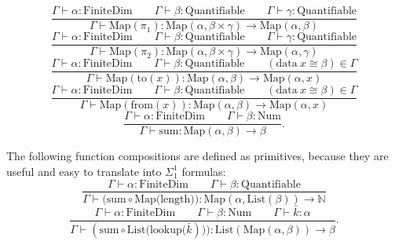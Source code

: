 \documentclass[11pt]{article}
\begin{document}
\begin{equation}
	\frac{
		\Gamma \vdash \alpha : \text{FiniteDim}
		\qquad \Gamma \vdash \beta : \text{Quantifiable}
		\qquad \Gamma \vdash \gamma : \text{Quantifiable}
	}{
		\Gamma \vdash \text{Map}(\pi_1)
		: \text{Map}(\alpha, \beta \times \gamma)
		\to \text{Map}(\alpha, \beta)
	}
\end{equation}
\begin{equation}
	\frac{
		\Gamma \vdash \alpha : \text{FiniteDim}
		\qquad \Gamma \vdash \beta : \text{Quantifiable}
		\qquad \Gamma \vdash \gamma : \text{Quantifiable}
	}{
		\Gamma \vdash \text{Map}(\pi_2)
		: \text{Map}(\alpha, \beta \times \gamma)
		\to \text{Map}(\alpha, \gamma)
	}
\end{equation}
\begin{equation}
	\frac{
		\Gamma \vdash \alpha : \text{FiniteDim}
		\qquad \Gamma \vdash \beta : \text{Quantifiable}
		\qquad (\text{data}\ x \cong \beta) \in \Gamma
	}{
		\Gamma \vdash \text{Map}(\text{to}(x)) : \text{Map}(\alpha, \beta) \to \text{Map}(\alpha, x)
	}
\end{equation}
\begin{equation}
	\frac{
		\Gamma \vdash \alpha : \text{FiniteDim}
		\qquad \Gamma \vdash \beta : \text{Quantifiable}
		\qquad (\text{data}\ x \cong \beta) \in \Gamma
	}{
		\Gamma \vdash \text{Map}(\text{from}(x)) : \text{Map}(\alpha, \beta) \to \text{Map}(\alpha, x)
	}
\end{equation}
\begin{equation}
	\frac{
		\Gamma \vdash \alpha : \text{FiniteDim}
		\qquad \Gamma \vdash \beta : \text{Num}
	}{
		\Gamma \vdash \text{sum} : \text{Map}(\alpha, \beta) \to \beta
	}.
\end{equation}

The following function compositions are defined as primitives, because they are
useful and easy to translate into $\Sigma^1_1$ formulas:
\begin{equation}
	\frac{
		\Gamma \vdash \alpha : \text{FiniteDim}
		\qquad \Gamma \vdash \beta : \text{Quantifiable}
	}{
		\Gamma \vdash (\text{sum} \circ \text{Map(length))} : \text{Map}(\alpha, \text{List}(\beta)) \to \mathbb{N}
	}
\end{equation}
\begin{equation}
	\frac{
		\Gamma \vdash \alpha : \text{FiniteDim}
		\qquad \Gamma \vdash \beta : \text{Num}
		\qquad \Gamma \vdash \bar{k} : \alpha
	}{
		\Gamma \vdash (\text{sum} \circ \text{List(lookup(}\bar{k}))) : \text{List}(\text{Map}(\alpha, \beta)) \to \beta
	}.
\end{equation}
\end{document}
